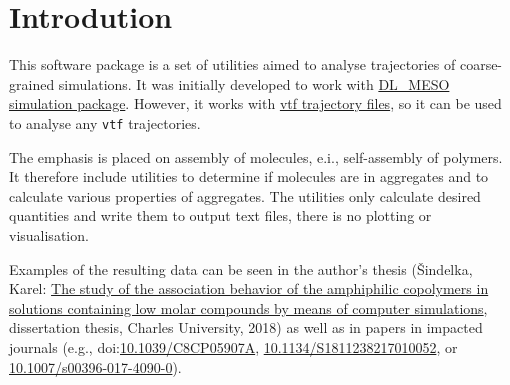 \chapter{Introdution}

This software package is a set of utilities aimed to analyse trajectories
of coarse-grained simulations. It was initially developed to work with
\href{http://www.scd.stfc.ac.uk//research/app/ccg/software/DL_MESO/40694.aspx}{DL\_MESO
simulation package}. However, it works with
\href{https://github.com/olenz/vtfplugin/wiki/VTF-format}{vtf trajectory
files}, so it can be used to analyse any \texttt{vtf} trajectories.

The emphasis is placed on assembly of molecules, e.i., self-assembly of
polymers. It therefore include utilities to determine if molecules are in
aggregates and to calculate various properties of aggregates.  The
utilities only calculate desired quantities and write them to output text
files, there is no plotting or visualisation.

Examples of the resulting data can be seen in the author's thesis
(Šindelka, Karel:
\href{https://is.cuni.cz/webapps/zzp/detail/150076/35695691/?q=%7B%22______searchform___search%22%3A%22karel+%5Cu0161indelka%22%2C%22______searchform___butsearch%22%3A%22Vyhledat%22%2C%22______facetform___facets___workType%22%3A%5B%22IP%22%5D%2C%22PNzzpSearchListbasic%22%3A1%7D&lang=en}{The
  study of the association behavior of the amphiphilic copolymers in
solutions containing low molar compounds by means of computer simulations},
dissertation thesis, Charles University, 2018) as well as in papers in
impacted journals (e.g.,
doi:\href{https://doi.org/10.1039/C8CP05907A}{10.1039/C8CP05907A},
\href{https://doi.org/10.1134/s1811238217010052}{10.1134/S1811238217010052},
or
\href{https://doi.org/10.1007/s00396-017-4090-0}{10.1007/s00396-017-4090-0}).

